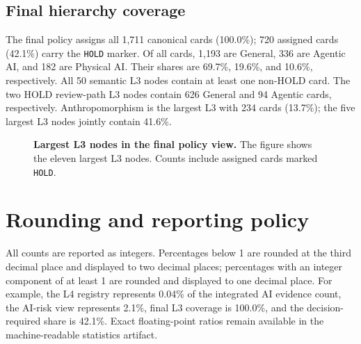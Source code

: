 \documentclass[11pt,a4paper]{article}
\newcommand{\code}[1]{\texttt{#1}}
\begin{document}
\subsection{Final hierarchy coverage}

The final policy assigns all 1,711 canonical cards (100.0\%); 720 assigned
cards (42.1\%) carry the \code{HOLD} marker. Of all cards, 1,193 are General,
336 are Agentic AI, and 182 are Physical AI. Their shares are 69.7\%, 19.6\%,
and 10.6\%, respectively. All 50 semantic L3 nodes contain at least one
non-HOLD card. The two HOLD review-path L3 nodes contain 626 General and 94
Agentic cards, respectively.
Anthropomorphism is the largest L3 with 234 cards (13.7\%); the five largest
L3 nodes jointly contain 41.6\%.

\begin{figure}[H]
\centering
{}
\caption{\textbf{Largest L3 nodes in the final policy view.} The figure shows
the eleven largest L3 nodes. Counts include assigned cards marked
\code{HOLD}.}
\label{fig:l3}
\end{figure}

\section{Rounding and reporting policy}

All counts are reported as integers. Percentages below 1 are rounded at the
third decimal place and displayed to two decimal places; percentages with an
integer component of at least 1 are rounded and displayed to one decimal place.
For example, the L4 registry represents 0.04\% of the integrated AI evidence
count, the AI-risk view represents 2.1\%, final L3 coverage is 100.0\%, and the
decision-required share is 42.1\%. Exact floating-point ratios remain available in the
machine-readable statistics artifact.
\end{document}
